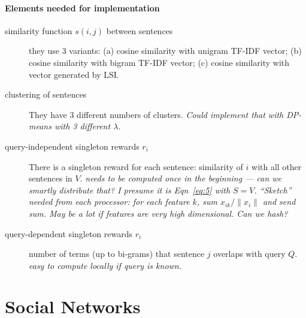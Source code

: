 \documentclass{article}
\begin{document}
\paragraph{Elements needed for implementation}
\begin{description}
\item[similarity function $s(i,j)$ between sentences] they use 3 variants:
  (a) cosine similarity with unigram TF-IDF vector; (b) cosine similarity with bigram TF-IDF vector; (c) cosine similarity with vector generated by LSI.
\item[clustering of sentences] They have 3 different numbers of clusters. \emph{Could implement that with DP-means with 3 different $\lambda$.}
\item[query-independent singleton rewards $r_i$] There is a singleton reward for each sentence: similarity of $i$ with all other sentences in $V$. \emph{needs to be computed once in the beginning --- can we smartly distribute that? I presume it is Eqn~\ref{eq:5} with $S=V$. ``Sketch'' needed from each processor: for each feature $k$, sum $x_{ik}/\|x_i\|$ and send sum. May be a lot if features are very high dimensional. Can we hash?}
\item[query-dependent singleton rewards $r_i$] number of terms (up to bi-grams) that sentence $j$ overlaps with query $Q$. \emph{easy to compute locally if query is known.}
  
\end{description}


\section{Social Networks}




\end{document}
